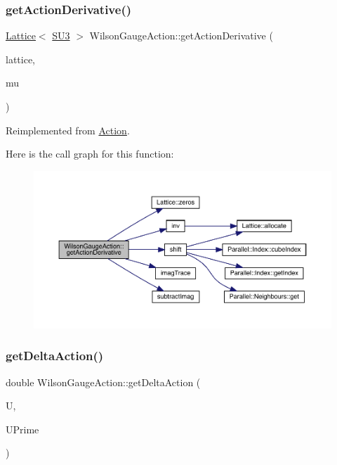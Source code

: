 \subsubsection{\texorpdfstring{getActionDerivative()}{getActionDerivative()}}
{\footnotesize\ttfamily \mbox{\hyperlink{class_lattice}{Lattice}}$<$ \mbox{\hyperlink{class_s_u3}{S\+U3}} $>$ Wilson\+Gauge\+Action\+::get\+Action\+Derivative (\begin{DoxyParamCaption}\item[{\mbox{\hyperlink{class_lattice}{Lattice}}$<$ \mbox{\hyperlink{class_s_u3}{S\+U3}} $>$ $\ast$}]{lattice,  }\item[{int}]{mu }\end{DoxyParamCaption})\hspace{0.3cm}{\ttfamily [virtual]}}



Reimplemented from \mbox{\hyperlink{class_action_a78168dd7c3819a3365e28fc1aae1b9b6}{Action}}.

Here is the call graph for this function\+:\nopagebreak
\begin{figure}[H]
\begin{center}
\leavevmode
\includegraphics[width=350pt]{class_wilson_gauge_action_a43cf939cd53495b7225fbeaa8a0ff6e8_cgraph}
\end{center}
\end{figure}
\mbox{\label{class_wilson_gauge_action_a60f2892e61489004df3cde6cc856b00b}} 
\subsubsection{\texorpdfstring{getDeltaAction()}{getDeltaAction()}}
{\footnotesize\ttfamily double Wilson\+Gauge\+Action\+::get\+Delta\+Action (\begin{DoxyParamCaption}\item[{\mbox{\hyperlink{class_s_u3}{S\+U3}}}]{U,  }\item[{\mbox{\hyperlink{class_s_u3}{S\+U3}}}]{U\+Prime }\end{DoxyParamCaption})\hspace{0.3cm}{\ttfamily [virtual]}}



